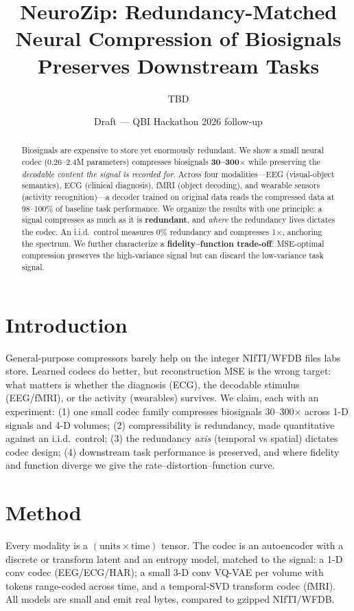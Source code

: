 \documentclass[11pt]{article}
\title{NeuroZip: Redundancy-Matched Neural Compression of Biosignals\\
Preserves Downstream Tasks}
\author{TBD}
\date{Draft --- QBI Hackathon 2026 follow-up}
\begin{document}
\maketitle

\begin{abstract}
Biosignals are expensive to store yet enormously redundant. We show a small neural
codec (0.26--2.4M parameters) compresses biosignals \textbf{30--300$\times$} while
preserving the \emph{decodable content the signal is recorded for}. Across four
modalities---EEG (visual-object semantics), ECG (clinical diagnosis), fMRI (object
decoding), and wearable sensors (activity recognition)---a decoder trained on
original data reads the compressed data at 98--100\% of baseline task performance.
We organize the results with one principle: a signal compresses as much as it is
\textbf{redundant}, and \emph{where} the redundancy lives dictates the codec. An
i.i.d.\ control measures 0\% redundancy and compresses 1$\times$, anchoring the
spectrum. We further characterize a \textbf{fidelity--function trade-off}:
MSE-optimal compression preserves the high-variance signal but can discard the
low-variance task signal.
\end{abstract}

\section{Introduction}
General-purpose compressors barely help on the integer NIfTI/WFDB files labs store.
Learned codecs do better, but reconstruction MSE is the wrong target: what matters is
whether the diagnosis (ECG), the decodable stimulus (EEG/fMRI), or the activity
(wearables) survives. We claim, each with an experiment: (1) one small codec family
compresses biosignals 30--300$\times$ across 1-D signals and 4-D volumes; (2)
compressibility is redundancy, made quantitative against an i.i.d.\ control; (3) the
redundancy \emph{axis} (temporal vs spatial) dictates codec design; (4) downstream
task performance is preserved, and where fidelity and function diverge we give the
rate--distortion--function curve.

\section{Method}
Every modality is a $(\text{units}\times\text{time})$ tensor. The codec is an
autoencoder with a discrete or transform latent and an entropy model, matched to the
signal: a 1-D conv codec (EEG/ECG/HAR); a small 3-D conv VQ-VAE per volume with
tokens range-coded across time, and a temporal-SVD transform codec (fMRI). All
models are small and emit real bytes, compared to gzipped NIfTI/WFDB.
\end{document}
